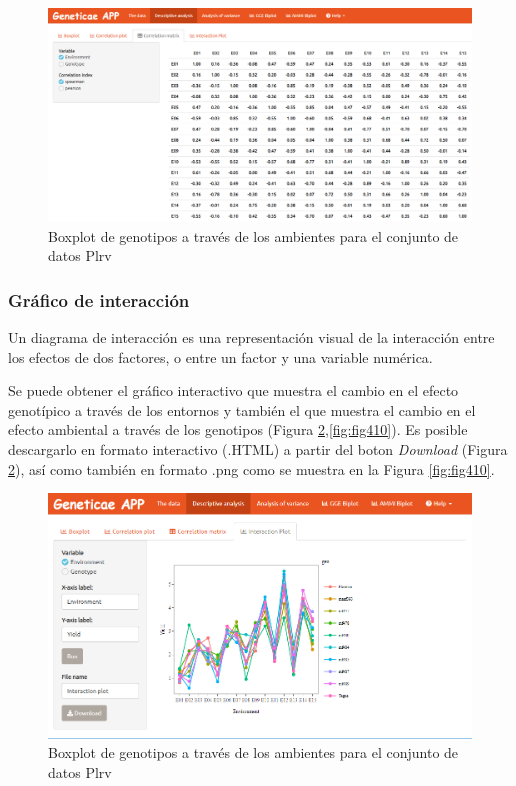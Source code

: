 \begin{figure}[H]
	\begin{center}
		\includegraphics[width=17cm]{./Graficos/corr_matrix.png}
	\end{center}
	\caption{Boxplot de genotipos a través de los ambientes para el conjunto de datos Plrv}
	\label{fig:fig47}
\end{figure}



\subsubsection{Gráfico de interacción}
Un diagrama de interacción es una representación visual de la interacción entre los efectos de dos factores, o entre un factor y una variable numérica. 

Se puede obtener el gráfico interactivo que muestra el cambio en el efecto genotípico a través de los entornos y también el que muestra el cambio en el efecto ambiental a través de los genotipos (Figura \ref{fig:fig49},\ref{fig:fig410}). Es posible descargarlo en formato interactivo (.HTML) a partir del boton \emph{Download} (Figura \ref{fig:fig49}), así como también en formato .png como se muestra en la Figura \ref{fig:fig410}.


\begin{figure}[H]
	\begin{center}
		\includegraphics[width=17cm]{./Graficos/int_plot.png}
	\end{center}
	\caption{Boxplot de genotipos a través de los ambientes para el conjunto de datos Plrv}
	\label{fig:fig49}
\end{figure}



